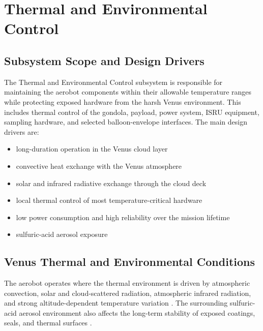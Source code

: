 \chapter{Thermal and Environmental Control}
\label{ch:thermal_environmental_control}
\section{Subsystem Scope and Design Drivers}
\label{sec:tcs_scope}
The Thermal and Environmental Control subsystem is responsible for maintaining the aerobot components within their allowable temperature ranges while protecting exposed hardware from the harsh Venus environment. This includes thermal control of the gondola, payload, power system, ISRU equipment, sampling hardware, and selected balloon-envelope interfaces.
The main design drivers are:
\vspace{-5pt}
\begin{itemize}[itemsep=1pt, parsep=1pt]
    \item long-duration operation in the Venus cloud layer
    \item convective heat exchange with the Venus atmosphere
    \item solar and infrared radiative exchange through the cloud deck
    \item local thermal control of most temperature-critical hardware
    \item low power consumption and high reliability over the mission lifetime
    \item sulfuric-acid aerosol exposure
\end{itemize}
\vspace{-10pt}
\section{Venus Thermal and Environmental Conditions}
\label{sec:venus_thermal_environment}

The aerobot operates where the thermal environment is driven by atmospheric convection, solar and cloud-scattered radiation, atmospheric infrared radiation, and strong altitude-dependent temperature variation \cite{IngersollPechmann1980_VenusHeatBalance}. The surrounding sulfuric-acid aerosol environment also affects the long-term stability of exposed coatings, seals, and thermal surfaces \cite{delitsky2023cloudchemistryvenus,Yavrouian2003}.

